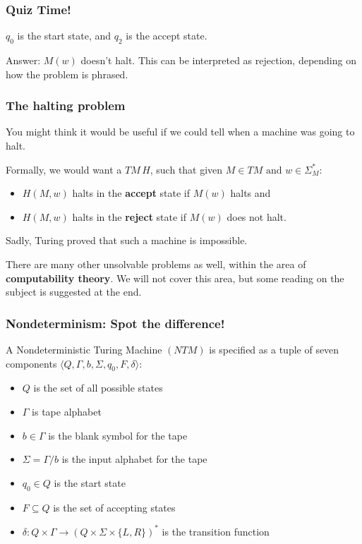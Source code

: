 \documentclass[aspectratio=169]{beamer}
\begin{document}
\begin{frame}
\frametitle{Quiz Time!}

\begin{center}
\end{center}

$q_0$ is the start state, and $q_2$ is the accept state.

Answer: $M(w)$ doesn't halt. This can be interpreted as rejection, depending on how the problem is phrased.
\end{frame}

\begin{frame}
\frametitle{The halting problem}
You might think it would be useful if we could tell when a machine was going to halt.

Formally, we would want a $TM\, H$, such that given $M \in TM \text{ and } w \in \Sigma_M^*$:

\begin{itemize}
	\item $H(M, w)$ halts in the {\bf accept} state if $M(w)$ halts and
	\item $H(M, w)$ halts in the {\bf reject} state if $M(w)$ does not halt.
\end{itemize}

Sadly, Turing proved that such a machine is impossible.

There are many other unsolvable problems as well, within the area of {\bf computability theory}. We will not cover this area, but some reading on the subject is suggested at the end.
\end{frame}

\begin{frame}
\frametitle{Nondeterminism: Spot the difference!}
A Nondeterministic Turing Machine $(NTM)$ is specified as a tuple of seven components $\langle Q, \Gamma, b, \Sigma, q_0, F, \delta \rangle$:

\begin{itemize}
	\item $Q$ is the set of all possible states
	\item $\Gamma$ is tape alphabet
	\item $b \in \Gamma$ is the blank symbol for the tape
	\item $\Sigma = \Gamma/b$ is the input alphabet for the tape
	\item $q_0 \in Q$ is the start state
	\item $F \subseteq Q$ is the set of accepting states
	\item $\delta: Q \times \Gamma \to (Q \times \Sigma \times \{L, R\})^*$ is the transition function
\end{itemize}
\end{frame}
\end{document}
